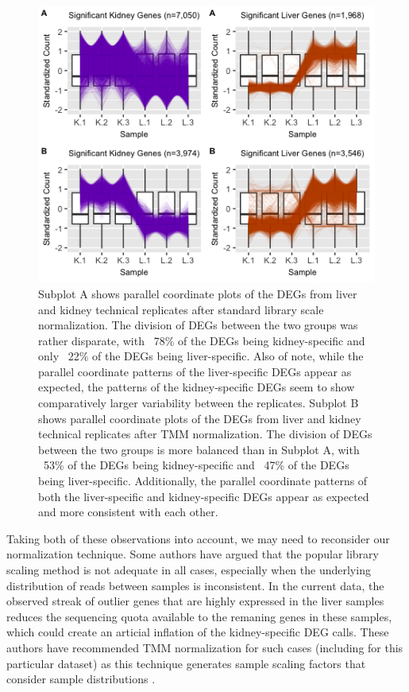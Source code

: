 \documentclass[11pt,a4paper,oldfontcommands,openany]{memoir}
\numberwithin{equation}{section} %
\begin{document}
\begin{figure}[!tpb]
\begin{framed}
\centerline{\includegraphics[width=1\columnwidth]{MakeFigures/lkClusters.jpg}}
\end{framed}
\caption{Subplot A shows parallel coordinate plots of the DEGs from liver and kidney technical replicates after standard library scale normalization. The division of DEGs between the two groups was rather disparate, with ~78\% of the DEGs being kidney-specific and only ~22\% of the DEGs being liver-specific. Also of note, while the parallel coordinate patterns of the liver-specific DEGs appear as expected, the patterns of the kidney-specific DEGs seem to show comparatively larger variability between the replicates. Subplot B shows parallel coordinate plots of the DEGs from liver and kidney technical replicates after TMM normalization. The division of DEGs between the two groups is more balanced than in Subplot A, with ~53\% of the DEGs being kidney-specific and ~47\% of the DEGs being liver-specific. Additionally, the parallel coordinate patterns of both the liver-specific and kidney-specific DEGs appear as expected and more consistent with each other.
\label{lkClusters}}
\end{figure} 

Taking both of these observations into account, we may need to reconsider our normalization technique. Some authors have argued that the popular library scaling method is not adequate in all cases, especially when the underlying distribution of reads between samples is inconsistent. In the current data, the observed streak of outlier genes that are highly expressed in the liver samples reduces the sequencing quota available to the remaning genes in these samples, which could create an articial inflation of the kidney-specific DEG calls. These authors have recommended TMM normalization for such cases (including for this particular dataset) as this technique generates sample scaling factors that consider sample distributions \citep{RobinsonOshlack}.
\end{document}
